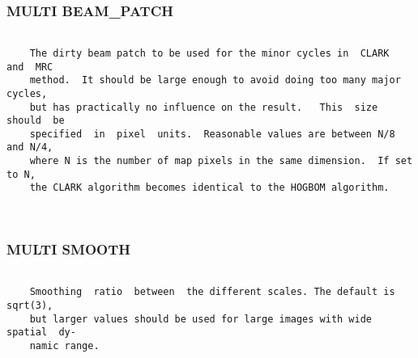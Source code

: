 \subsubsection{MULTI BEAM\_PATCH}
\begin{verbatim}

    The dirty beam patch to be used for the minor cycles in  CLARK  and  MRC
    method.  It should be large enough to avoid doing too many major cycles,
    but has practically no influence on the result.   This  size  should  be
    specified  in  pixel  units.  Reasonable values are between N/8 and N/4,
    where N is the number of map pixels in the same dimension.  If set to N,
    the CLARK algorithm becomes identical to the HOGBOM algorithm.



\end{verbatim}
\subsubsection{MULTI SMOOTH}
\begin{verbatim}

    Smoothing  ratio  between  the different scales. The default is sqrt(3),
    but larger values should be used for large images with wide spatial  dy-
    namic range.

\end{verbatim}

